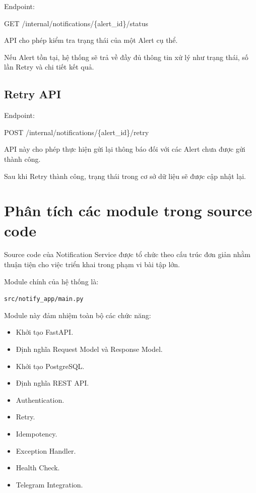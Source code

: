 Endpoint:

\begin{center}
GET /internal/notifications/\{alert\_id\}/status
\end{center}

API cho phép kiểm tra trạng thái của một Alert cụ thể.

Nếu Alert tồn tại, hệ thống sẽ trả về đầy đủ thông tin xử lý như trạng thái, số lần Retry và chi tiết kết quả.

\subsection{Retry API}

Endpoint:

\begin{center}
POST /internal/notifications/\{alert\_id\}/retry
\end{center}

API này cho phép thực hiện gửi lại thông báo đối với các Alert chưa được gửi thành công.

Sau khi Retry thành công, trạng thái trong cơ sở dữ liệu sẽ được cập nhật lại.

\section{Phân tích các module trong source code}

Source code của Notification Service được tổ chức theo cấu trúc đơn giản nhằm thuận tiện cho việc triển khai trong phạm vi bài tập lớn.

Module chính của hệ thống là:

\begin{center}
\texttt{src/notify\_app/main.py}
\end{center}

Module này đảm nhiệm toàn bộ các chức năng:

\begin{itemize}
\item Khởi tạo FastAPI.
\item Định nghĩa Request Model và Response Model.
\item Khởi tạo PostgreSQL.
\item Định nghĩa REST API.
\item Authentication.
\item Retry.
\item Idempotency.
\item Exception Handler.
\item Health Check.
\item Telegram Integration.
\end{itemize}

